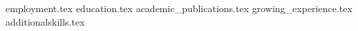\documentclass[11pt, a4paper]{awesome-cv}
\newcommand*{\sectiondir}{resume/}
\begin{document}
\makecvheader

{employment.tex}
{education.tex}
{academic_publications.tex}
{growing_experience.tex}
{additionalskills.tex}

\end{document}
